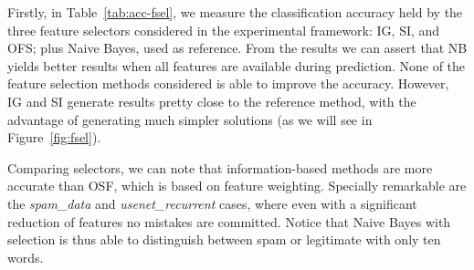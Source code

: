 \documentclass[preprint,12pt]{elsarticle}
\begin{document}
Firstly, in Table~\ref{tab:acc-fsel}, we measure the classification accuracy held by the three feature selectors considered in the experimental framework: IG, SI, and OFS; plus Naive Bayes, used as reference. From the results we can assert that NB yields better results when all features are available during prediction. None of the feature selection methods considered is able to improve the accuracy. However, IG and SI generate results pretty close to the reference method, with the advantage of generating much simpler solutions (as we will see in Figure~\ref{fig:fsel}). 

Comparing selectors, we can note that information-based methods are more accurate than OSF, which is based on feature weighting. Specially remarkable are the \textit{spam\_data} and \textit{usenet\_recurrent} cases, where even with a significant reduction of features no mistakes are committed. Notice that Naive Bayes with selection is thus able to distinguish between spam or legitimate with only ten words. 
\end{document}
